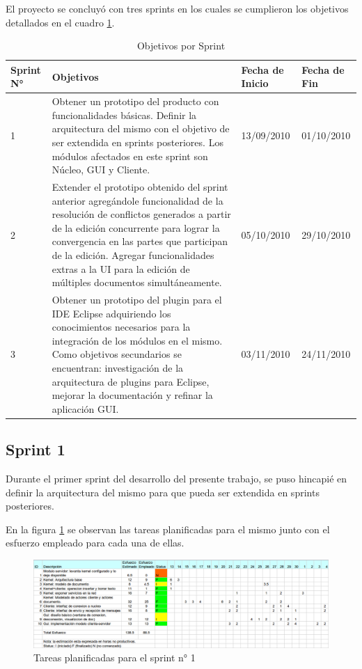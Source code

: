 \documentclass[12pt,a4paper]{article}
\begin{document}
El proyecto se concluyó con tres sprints en los cuales se cumplieron los objetivos detallados en el cuadro \ref{objetivos_por_sprint}.

\begin{table}
    \begin{tabular}{ | l | p{6.5cm} | p{2cm} | p{2cm} | }
    \hline
	Sprint N° & Objetivos & Fecha de Inicio & Fecha de Fin \\ \hline

	1 & Obtener un prototipo del producto con funcionalidades básicas. Definir la arquitectura del mismo con el
	objetivo de ser extendida en sprints posteriores. Los módulos afectados en este sprint son Núcleo, GUI y Cliente.
	& 13/09/2010 & 01/10/2010 \\ \hline

	2 & Extender el prototipo obtenido del sprint anterior agregándole funcionalidad de la resolución de conflictos
	generados a partir de la edición concurrente para lograr la convergencia en las partes que participan de la edición.
	Agregar funcionalidades extras a la UI para la edición de múltiples documentos simultáneamente.
	& 05/10/2010 & 29/10/2010 \\ \hline

	3 & Obtener un prototipo del plugin para el IDE Eclipse adquiriendo los conocimientos necesarios para la integración de los
	módulos en el mismo. Como objetivos secundarios se encuentran: investigación de la arquitectura de plugins para Eclipse, mejorar
	la documentación y refinar la aplicación GUI.
	& 03/11/2010 & 24/11/2010 \\ \hline

    \end{tabular}
    \caption{\label{objetivos_por_sprint} Objetivos por Sprint}
\end{table}

\subsection{Sprint 1}

Durante el primer sprint del desarrollo del presente trabajo, se puso hincapié en definir la arquitectura del mismo
para que pueda ser extendida en sprints posteriores.

En la figura \ref{sprint1-tareas} se observan las tareas planificadas para el mismo junto con el esfuerzo empleado para
cada una de ellas.

	\begin{figure}[!ht]
		\begin{center}
			\includegraphics[width=14cm]{sprint1.png}
			\caption{\label{sprint1-tareas} Tareas planificadas para el sprint n° 1 }
		\end{center}
	\end{figure}
\end{document}
